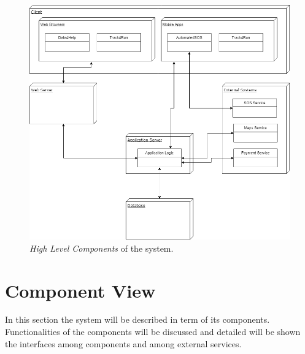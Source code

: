 \begin{figure}[H]
  \begin{center}
  	\includegraphics[width=\textwidth]{./img/HighLevelComponents.png}
    \hspace{0.05\linewidth}
    \centering
    \caption{\textit{High Level Components} of the system.}
		\label{img:highLevelComponents}
    \end{center}
\end{figure}

\section{Component View}
In this section the system will be described in term of its components. Functionalities of the components will be discussed and detailed will be shown the interfaces among components and among external services.

